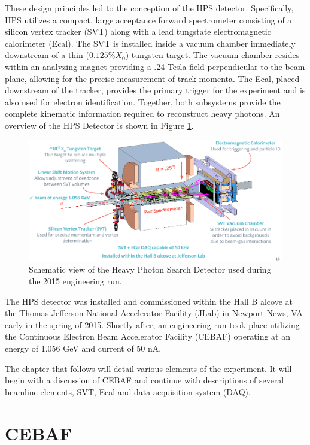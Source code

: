 These design principles led to the conception of the HPS detector.  
Specifically, HPS utilizes a compact, large acceptance forward spectrometer 
consisting of a silicon vertex tracker (SVT) along with a lead tungstate
electromagnetic calorimeter (Ecal).  The SVT is installed inside a vacuum
chamber immediately downstream of a thin ($0.125\%X_{0}$) tungsten target.
The vacuum chamber resides within an analyzing magnet providing a .24 Tesla field 
perpendicular to
the beam plane,
allowing for the precise measurement of track momenta.
The Ecal, placed downstream of the tracker, provides the primary 
trigger for the experiment and is also used for electron identification. Together, 
both subsystems provide the complete kinematic information required to 
reconstruct heavy photons.  An overview of the HPS Detector is shown in Figure
\ref{fig:hps_detector}.
\begin{figure}[th]
    \centering
    \includegraphics[width=\textwidth]{images/hps_detector.png}
    \caption{Schematic view of the Heavy Photon Search Detector used during the
             2015 engineering run.}
    \label{fig:hps_detector}
\end{figure}

The HPS detector was installed and commissioned within the Hall B alcove at the
Thomas Jefferson National Accelerator Facility (JLab) in Newport News, VA early
in the spring of 2015. Shortly after, an engineering run took place utilizing
the Continuous Electron Beam Accelerator Facility (CEBAF) operating at an 
energy of 1.056 GeV and current of 50 nA.

The chapter that follows will detail various elements of the experiment.
It will begin with a discussion of CEBAF and continue with descriptions
of several beamline elements, SVT, Ecal and data acquisition system (DAQ).

\section{CEBAF}

